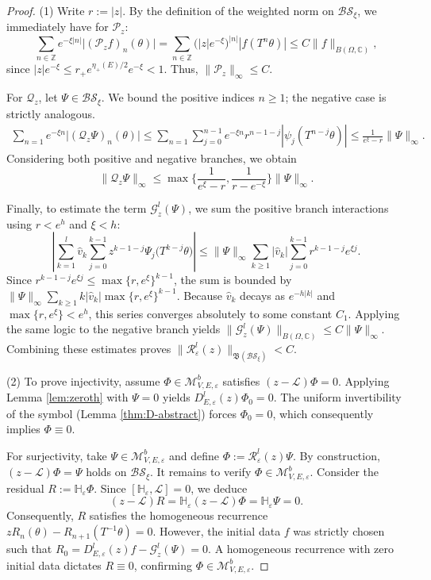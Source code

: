 \documentclass[reqno,11pt]{amsart}
\newcommand{\Z}{{\mathbb Z}}
\newcommand{\C}{{\mathbb C}}
\begin{document}
\begin{proof}
(1)
Write $r := |z|$. By the definition of the weighted norm on $\mathcal{BS_\xi}$, we immediately have for $\mathcal{P}_z$:
$$
\sum_{n\in\Z} e^{-\xi |n|}\bigl|(\mathcal{P}_z f)_n(\theta)\bigr| = \sum_{n\in\Z}\bigl(|z|e^{-\xi}\bigr)^{|n|} |f(T^n\theta)| \le C\|f\|_{B(\Omega,\C)},
$$
since $|z|e^{-\xi} \le r_+ e^{\eta_+(E)/2} e^{-\xi} < 1$. Thus, $\|\mathcal{P}_z \|_\infty \leq C$.

For $\mathcal{Q}_z$, let $\Psi\in \mathcal{BS_\xi}$. We bound the positive indices $n \ge 1$; the negative case is strictly analogous.
\begin{align*}
\sum_{n= 1}e^{-\xi n}\bigl|(\mathcal{Q}_z\Psi)_n(\theta)\bigr|
\le \sum_{n=1}\sum_{j=0}^{n-1} e^{-\xi n} r^{n-1-j} |\psi_j(T^{n-j}\theta)|
 \le \frac{1}{e^\xi - r} \|\Psi\|_\infty.
\end{align*}
Considering both positive and negative branches, we obtain $$\|\mathcal{Q}_z\Psi\|_\infty \le \max\bigl\{ \frac{1}{e^\xi - r}, \frac{1}{r - e^{-\xi}} \bigr\} \|\Psi\|_\infty.$$

Finally, to estimate the term $\mathcal{G}_z^l(\Psi)$, we sum the positive branch interactions using $r < e^h$ and $\xi < h$:
$$
\left| \sum_{k=1}^l \hat{v}_k \sum_{j=0}^{k-1} z^{k-1-j}\Psi_j\bigl(T^{k-j}\theta\bigr) \right| 
\le \|\Psi\|_\infty \sum_{k\ge 1} |\hat{v}_k| \sum_{j=0}^{k-1} r^{k-1-j} e^{\xi j}.
$$
Since $r^{k-1-j} e^{\xi j} \le \max\{r, e^\xi\}^{k-1}$, the sum is bounded by $\|\Psi\|_\infty \sum_{k\ge 1} k |\hat{v}_k| \max\{r, e^\xi\}^{k-1}$. Because $\hat{v}_k$ decays as $e^{-h|k|}$ and $\max\{r, e^\xi\} < e^h$, this series converges absolutely to some constant $C_1$. Applying the same logic to the negative branch yields $\|\mathcal{G}_z^l(\Psi)\|_{B(\Omega,\C)} \le C \|\Psi\|_\infty$. Combining these estimates proves $
\|\mathcal R_\varepsilon^{l}(z)\|_{\mathfrak{B}(\mathcal{BS_\xi})} < C.$


(2) To prove injectivity, assume $\Phi \in \mathcal{M}_{V,E,\varepsilon}^b$ satisfies $(z-\mathcal{L})\Phi = 0$. Applying Lemma \ref{lem:zeroth} with $\Psi=0$ yields $D^l_{E,\varepsilon}(z)\Phi_0 = 0$. The uniform invertibility of the symbol (Lemma \ref{thm:D-abstract}) forces $\Phi_0 = 0$, which consequently implies $\Phi \equiv 0$.






For surjectivity, take $\Psi \in \mathcal{M}_{V,E,\varepsilon}^b$ and define $\Phi := \mathcal{R}_\varepsilon^l(z)\Psi$. By construction, $(z-\mathcal{L})\Phi = \Psi$ holds on $\mathcal{BS}_\xi$. It remains to verify $\Phi \in \mathcal{M}_{V,E,\varepsilon}^b$. Consider the residual $R := \mathbb{H}_\varepsilon\Phi$. Since $[\mathbb{H}_\varepsilon, \mathcal{L}] = 0$, we deduce
$$
(z-\mathcal{L})R = \mathbb{H}_\varepsilon(z-\mathcal{L})\Phi = \mathbb{H}_\varepsilon\Psi = 0.
$$
Consequently, $R$ satisfies the homogeneous recurrence $z R_n(\theta) - R_{n+1}(T^{-1}\theta) = 0$. However, the initial data $f$ was strictly chosen such that $R_0 = D_{E,\varepsilon}^l(z)f - \mathcal{G}_z^l(\Psi) = 0$. A homogeneous recurrence with zero initial data dictates $R \equiv 0$, confirming $\Phi \in \mathcal{M}_{V,E,\varepsilon}^b$.


\end{proof}
\end{document}
